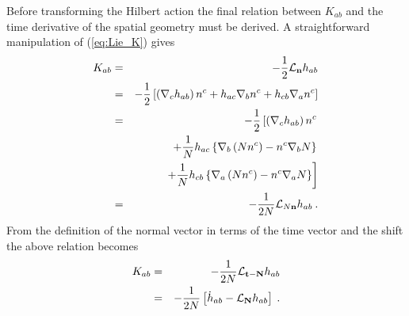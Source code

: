 Before transforming the Hilbert action the final relation between $K_{ab}$ and
the time derivative of the spatial geometry must be derived.  A straightforward
manipulation of (\ref{eq:Lie_K}) gives
\begin{eqnarray}\label{eq:Lie_K_2}
   K_{ab} & = & -\frac{1}{2} {\mathcal L}_{\mathbf{n}} h_{ab} \nonumber \\
          & = & -\frac{1}{2} \left[
                                \left(\nabla_c h_{ab}\right)n^c
                                + h_{ac} \nabla_b n^c + h_{cb} \nabla_a n^c
                               \right] \nonumber \\
          & = & -\frac{1}{2} \left[
                                \left(
                                  \nabla_c h_{ab}
                                \right)n^c \right. \nonumber \\
          &   &                   \left. + \frac{1}{N}h_{ac}
                                  \left\{ \nabla_b \left(N n^c \right)
                                          - n^c \nabla_b N \right\} \right. \nonumber \\
          &   &                   \left. + \frac{1}{N}h_{cb}
                                  \left\{ \nabla_a \left(N n^c \right)
                                          - n^c \nabla_a N \right\}
                             \right] \nonumber \\
          & = & -\frac{1}{2N} {\mathcal L}_{N\mathbf{n}} h_{ab} \: .
\end{eqnarray}
From the definition of the normal vector in terms of the time vector and the shift
the above relation becomes
\begin{eqnarray}
K_{ab}    & = & -\frac{1}{2 N} {\mathcal L}_{\mathbf{t} - \mathbf{N}} h_{ab} \nonumber \\
          & = & -\frac{1}{2 N} \left[ {\dot h}_{ab}
               - {\mathcal L}_{\mathbf{N}} h_{ab} \right] \: .
\end{eqnarray}

